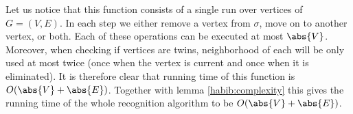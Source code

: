 Let us notice that this function consists of a single run over vertices of $G = (V,E)$. In each step we either remove a vertex from $\sigma$, move on to another vertex, or both. Each of these operations can be executed at most $\abs{V}$. Moreover, when checking if vertices are twins, neighborhood of each will be only used at most twice (once when the vertex is current and once when it is eliminated). It is therefore clear that running time of this function is $O(\abs{V} + \abs{E})$. Together with lemma \ref{habib:complexity} this gives the running time of the whole recognition algorithm to be $O(\abs{V} + \abs{E})$.